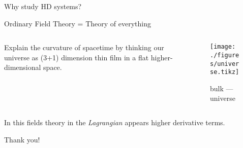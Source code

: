 \documentclass[10pt]{beamer}
\begin{document}
  \begin{frame}{Why study HD systems?}
    \begin{alertblock}{Ordinary Field Theory = Theory of everything}
    \begin{columns}
      \begin{column}{0.45\textwidth}
        Explain the curvature of spacetime by thinking our universe as (3+1)
        dimension thin film in a flat higher-dimensional space.
      \end{column}
      \begin{column}{0.45\textwidth}
        \begin{figure}
          \texttt{[image: ./figures/universe.tikz]}
          \caption[labelformat=empty]{bulk ---
          \alert{universe}}\label{fig:Universe}
        \end{figure}
      \end{column}
    \end{columns}
    \end{alertblock}
    In this fields theory in the \emph{Lagrangian} appears \alert{higher
    derivative terms}.
  \end{frame}

  \begin{frame}[standout]
    Thank you!
  \end{frame}
\end{document}
